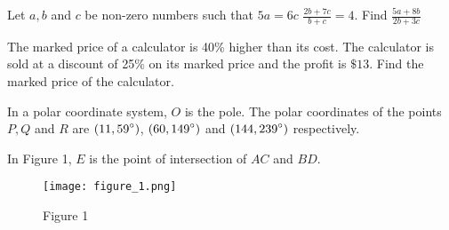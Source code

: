 \documentclass[11pt,paper=a4,answers]{exam}
\begin{document}
\begin{questions}
\vspace{0.5cm}
\label{2024-I-5: Ratios}
\question[4]
    Let $\displaystyle a, b$ and  $\displaystyle c$ be non-zero numbers such that 
    $\displaystyle 5a = 6c$
    $\displaystyle \frac{2b + 7c}{b + c} = 4$.
    Find 
    $\displaystyle \frac{5a + 8b}{2b + 3c}$
    \droppoints

\vspace{0.5cm}
\label{2024-I-6: Percentages}
\question[4]
    The marked price of a calculator is 40\% higher than its cost. The calculator is sold at a discount of 25\% on its marked price and the profit is $\$13$. 
    Find the marked price of the calculator.
    \droppoints

\newpage
\vspace{0.5cm}
\label{2024-I-7: Polar}
\question[4]
    In a polar coordinate system, $
    \displaystyle O$ is the pole. The polar coordinates of the points $\displaystyle P, Q$ and $\displaystyle R$ are
    $\displaystyle(11, 59\degree)$, $\displaystyle (60, 149\degree)$ and $\displaystyle (144, 239\degree)$ respectively.

    \droppoints

\vspace{0.5cm}
\label{2024-I-8: Congruence & Pyth}
\question[5]
    In Figure 1, $ \displaystyle E$ is the point of intersection of $\displaystyle AC$ and $\displaystyle BD$. 

    \begin{figure}[ht]
        \centering
        \texttt{[image: figure\_1.png]}
        \caption*{Figure 1}
    \end{figure}


\end{questions}
\end{document}
